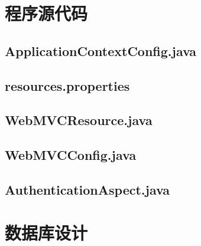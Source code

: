 
\chapter{程序源代码}
\section{ApplicationContextConfig.java}\label{sec:ApplicationContextConfig}

\section{resources.properties}\label{sec:resources}

\section{WebMVCResource.java}\label{sec:WebMVCResource}

\section{WebMVCConfig.java}\label{sec:WebMVCConfig}

\section{AuthenticationAspect.java}\label{sec:AuthenticationAspect}

\chapter{数据库设计}\label{sec:databasediagram}
